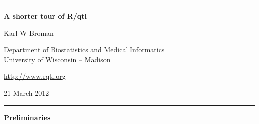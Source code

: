 \documentclass[10pt,letterpaper]{article}
\begin{document}
\begin{center}
\rule{7.0in}{1mm} \vspace{0mm}

{\Large \textbf{A shorter tour of R/qtl}} \vspace{4mm}

{\large Karl W Broman} \vspace{2mm}

Department of Biostatistics and Medical Informatics\\
University of Wisconsin -- Madison

\vspace{2mm}
\href{http://www.rqtl.org}{http://www.rqtl.org}
\vspace{2mm}

21 March 2012 %

\rule{7.0in}{1mm} 
\end{center}



\textbf{Preliminaries} \vspace{6pt}
\end{document}
